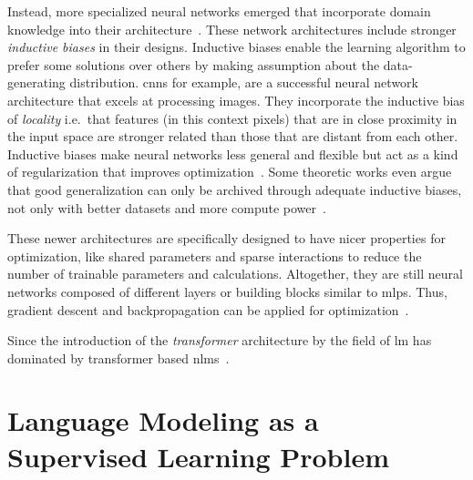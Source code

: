 Instead, more specialized neural networks emerged that incorporate domain knowledge into their architecture~\autocite{Goodfellow-et-al-2016}.
These network architectures include stronger \textit{inductive biases} in their designs.
Inductive biases enable the learning algorithm to prefer some solutions over others by making assumption about the data-generating distribution.
\glspl{cnn} for example, are a successful neural network architecture that excels at processing images.
They incorporate the inductive bias of \textit{locality} i.e.\ that features (in this context pixels) that are in close proximity in the input space are stronger related than those that are distant from each other.
Inductive biases make neural networks less general and flexible but act as a kind of regularization that improves optimization~\autocite{battaglia2018relationalinductivebiasesdeep}.
Some theoretic works even argue that good generalization can only be archived through adequate inductive biases, not only with better datasets and more compute power~\autocite{goyal2022inductive}.

These newer architectures are specifically designed to have nicer properties for optimization, like shared parameters and sparse interactions to reduce the number of trainable parameters and calculations.
Altogether, they are still neural networks composed of different layers or building blocks similar to \glspl{mlp}.
Thus, gradient descent and backpropagation can be applied for optimization~\autocite{Goodfellow-et-al-2016}.

Since the introduction of the \textit{transformer} architecture by \textcite{vaswani2023attention} the field of \acrlong{lm} has dominated by transformer based \glspl{nlm}~\autocite{cazenavette2021bias}.




\section{Language Modeling as a Supervised Learning Problem}\label{sec:trans}

